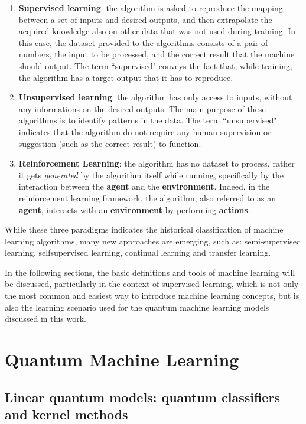 \begin{enumerate}

\item \textbf{Supervised learning}: the algorithm is asked to reproduce the mapping between a set of
inputs and desired outputs, and then extrapolate the acquired knowledge also on other data
that was not used during training. In this case, the dataset provided to the algorithms consists
of a pair of numbers, the input to be processed, and the correct result that the machine
should output. The term “supervised" conveys the fact that, while training, the algorithm has
a target output that it has to reproduce.
\item \textbf{Unsupervised learning}: the algorithm has only access to inputs, without any informations
on the desired outputs. 
The main purpose of these algorithms is to identify patterns in the data.
The term “unsupervised" indicates that the algorithm do not require any human supervision or suggestion 
(such as the correct result) to function.
\item \textbf{Reinforcement Learning}: the algorithm has no dataset to process, rather it gets \textit{generated}
by the algorithm itself while running, specifically by the interaction between the \textbf{agent} and the 
\textbf{environment}.
Indeed, in the reinforcement learning framework, the algorithm, also referred to as an \textbf{agent}, 
interacts with an \textbf{environment} by performing \textbf{actions}.

\end{enumerate}

While these three paradigms indicates the historical classification of machine learning algorithms, many new
approaches are emerging, such as: semi-supervised learning, selfsupervised learning, continual learning and 
transfer learning.

In the following sections, the basic definitions and tools of machine learning will be discussed, particularly in
the context of supervised learning, which is not only the most common and easiest way to introduce
machine learning concepts, but is also the learning scenario used for the quantum machine learning
models discussed in this work.

\section{Quantum Machine Learning}

\subsection{Linear quantum models: quantum classifiers and kernel methods}

